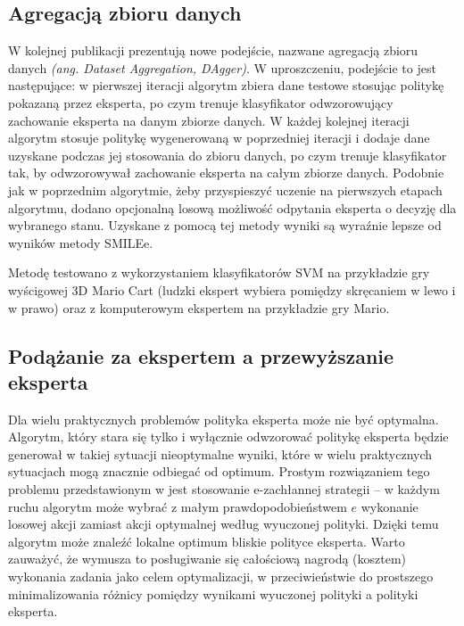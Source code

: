\subsection{Agregacją zbioru danych}\label{dagger_desc}
W kolejnej publikacji \cite{DBLP:journals/corr/abs-1011-0686} prezentują nowe podejście, nazwane agregacją zbioru danych \textit{(ang. Dataset Aggregation, DAgger)}. W uproszczeniu, podejście to jest następujące: w pierwszej iteracji algorytm zbiera dane testowe stosując politykę pokazaną przez eksperta, po czym trenuje klasyfikator odwzorowujący zachowanie eksperta na danym zbiorze danych. W każdej kolejnej iteracji algorytm stosuje politykę wygenerowaną w poprzedniej iteracji i dodaje dane uzyskane podczas jej stosowania do zbioru danych, po czym trenuje klasyfikator tak, by odwzorowywał zachowanie eksperta na całym zbiorze danych. Podobnie jak w poprzednim algorytmie, żeby przyspieszyć uczenie na pierwszych etapach algorytmu, dodano opcjonalną losową możliwość odpytania eksperta o decyzję dla wybranego stanu. Uzyskane z pomocą tej metody wyniki są wyraźnie lepsze od wyników metody SMILEe.

Metodę testowano z wykorzystaniem klasyfikatorów SVM na przykładzie gry wyścigowej 3D Mario Cart (ludzki ekspert wybiera pomiędzy skręcaniem w lewo i w prawo) oraz z komputerowym ekspertem na przykładzie gry Mario.

\subsection{Podążanie za ekspertem a przewyższanie eksperta}
Dla wielu praktycznych problemów polityka eksperta może nie być optymalna. Algorytm, który stara się tylko i wyłącznie odwzorować politykę eksperta będzie generował w takiej sytuacji nieoptymalne wyniki, które w wielu praktycznych sytuacjach mogą znacznie odbiegać od optimum. Prostym rozwiązaniem tego problemu przedstawionym w \cite{DBLP:journals/corr/ChangKADL15} jest stosowanie e-zachłannej strategii – w każdym ruchu algorytm może wybrać z małym prawdopodobieństwem $e$ wykonanie losowej akcji zamiast akcji optymalnej według wyuczonej polityki. Dzięki temu algorytm może znaleźć lokalne optimum bliskie polityce eksperta. Warto zauważyć, że wymusza to posługiwanie się całościową nagrodą (kosztem) wykonania zadania jako celem optymalizacji, w przeciwieństwie do prostszego minimalizowania różnicy pomiędzy wynikami wyuczonej polityki a polityki eksperta.
